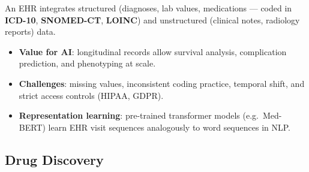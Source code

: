 \begin{tcbitemize}[ skin=sectionraster ]
    \tcbitem[title={Electronic Health Records (EHR)}, raster multicolumn=3]
    An EHR integrates structured (diagnoses, lab values, medications — coded in \textbf{ICD-10}, \textbf{SNOMED-CT}, \textbf{LOINC}) and unstructured (clinical notes, radiology reports) data.
    \begin{itemize}
        \item \textbf{Value for AI}: longitudinal records allow survival analysis, complication prediction, and phenotyping at scale.
        \item \textbf{Challenges}: missing values, inconsistent coding practice, temporal shift, and strict access controls (HIPAA, GDPR).
        \item \textbf{Representation learning}: pre-trained transformer models (e.g.\ Med-BERT) learn EHR visit sequences analogously to word sequences in NLP.
    \end{itemize}
    \textsuperscript{\cite[][p.~464]{juhnArtificialIntelligenceNLP2020}}
\end{tcbitemize}

\subsection{Drug Discovery}

